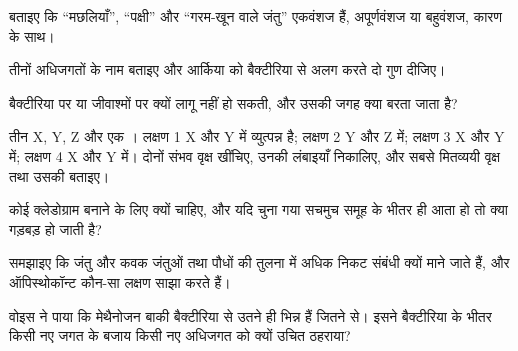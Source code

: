\begin{exercise}[$\star$]\label{exo:b1:classifying-biodiversity:3}
बताइए कि ``मछलियाँ'', ``पक्षी'' और ``गरम-खून वाले जंतु'' एकवंशज हैं,
अपूर्णवंशज या बहुवंशज, कारण के साथ।
\end{exercise}

\begin{exercise}[$\star$]\label{exo:b1:classifying-biodiversity:4}
तीनों अधिजगतों के नाम बताइए और आर्किया को बैक्टीरिया से अलग करते दो गुण
दीजिए।
\end{exercise}

\begin{exercise}[$\star\star$]\label{exo:b1:classifying-biodiversity:5}
 बैक्टीरिया पर या जीवाश्मों पर क्यों लागू नहीं हो
सकती, और उसकी जगह क्या बरता जाता है?
\end{exercise}

\begin{exercise}[$\star\star$]\label{exo:b1:classifying-biodiversity:6}
तीन  X, Y, Z और एक । लक्षण 1 X और Y में व्युत्पन्न है;
लक्षण 2 Y और Z में; लक्षण 3 X और Y में; लक्षण 4 X और
Y में। दोनों संभव वृक्ष खींचिए, उनकी लंबाइयाँ निकालिए, और सबसे मितव्ययी
वृक्ष तथा उसकी  बताइए।
\end{exercise}

\begin{exercise}[$\star\star$]\label{exo:b1:classifying-biodiversity:7}
कोई क्लेडोग्राम बनाने के लिए  क्यों चाहिए, और यदि चुना गया
 सचमुच समूह के भीतर ही आता हो तो क्या गड़बड़ हो जाती है?
\end{exercise}

\begin{exercise}[$\star\star$]\label{exo:b1:classifying-biodiversity:8}
समझाइए कि जंतु और कवक जंतुओं तथा पौधों की तुलना में अधिक निकट संबंधी
क्यों माने जाते हैं, और ऑपिस्थोकॉन्ट कौन-सा लक्षण साझा करते हैं।
\end{exercise}

\begin{exercise}[$\star\star$]\label{exo:b1:classifying-biodiversity:9}
वोइस ने पाया कि मेथैनोजन बाकी बैक्टीरिया से उतने ही भिन्न हैं जितने
 से। इसने बैक्टीरिया के भीतर किसी नए जगत के बजाय किसी नए
अधिजगत को क्यों उचित ठहराया?
\end{exercise}

